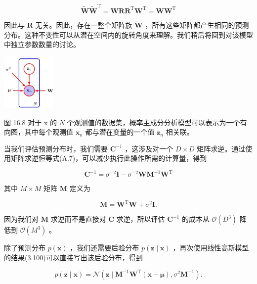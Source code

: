 \documentclass[10pt]{article}
\begin{document}
\[
\widetilde{\mathbf{W}}{\widetilde{\mathbf{W}}}^{\mathrm{T}} = {\mathbf{{WRR}}}^{\mathrm{T}}{\mathbf{W}}^{\mathrm{T}} = {\mathbf{{WW}}}^{\mathrm{T}} \tag{16.40}
\]

因此与 \(\mathbf{R}\) 无关。因此，存在一整个矩阵族 \(\widetilde{\mathbf{W}}\) ，所有这些矩阵都产生相同的预测分布。这种不变性可以从潜在空间内的旋转角度来理解。我们稍后将回到对该模型中独立参数数量的讨论。

\begin{center}
\includegraphics[max width=0.2\textwidth]{images/0194e279-9b28-703a-88f4-c3ac21e2010d_528_1242_345_297_310_0.jpg}
\end{center}
\hspace*{3em} 

图 16.8 对于 \(\mathrm{x}\) 的 \(N\) 个观测值的数据集，概率主成分分析模型可以表示为一个有向图，其中每个观测值 \({\mathbf{x}}_{n}\) 都与潜在变量的一个值 \({\mathbf{z}}_{n}\) 相关联。

当我们评估预测分布时，我们需要 \({\mathbf{C}}^{-1}\) ，这涉及对一个 \(D \times  D\) 矩阵求逆。通过使用矩阵求逆恒等式(A.7)，可以减少执行此操作所需的计算量，得到

\[
{\mathbf{C}}^{-1} = {\sigma }^{-2}\mathbf{I} - {\sigma }^{-2}\mathbf{W}{\mathbf{M}}^{-1}{\mathbf{W}}^{\mathrm{T}} \tag{16.41}
\]

其中 \(M \times  M\) 矩阵 \(\mathbf{M}\) 定义为

\[
\mathbf{M} = {\mathbf{W}}^{\mathrm{T}}\mathbf{W} + {\sigma }^{2}\mathbf{I}. \tag{16.42}
\]

因为我们对 \(\mathbf{M}\) 求逆而不是直接对 \(\mathbf{C}\) 求逆，所以评估 \({\mathbf{C}}^{-1}\) 的成本从 \(\mathcal{O}\left( {D}^{3}\right)\) 降低到 \(\mathcal{O}\left( {M}^{3}\right)\) 。

除了预测分布 \(p\left( \mathbf{x}\right)\) ，我们还需要后验分布 \(p\left( {\mathbf{z} \mid  \mathbf{x}}\right)\) ，再次使用线性高斯模型的结果(3.100)可以直接写出该后验分布，得到

\[
p\left( {\mathbf{z} \mid  \mathbf{x}}\right)  = \mathcal{N}\left( {\mathbf{z} \mid  {\mathbf{M}}^{-1}{\mathbf{W}}^{\mathrm{T}}\left( {\mathbf{x} - \mathbf{\mu }}\right) ,{\sigma }^{2}{\mathbf{M}}^{-1}}\right) . \tag{16.43}
\]
\end{document}

